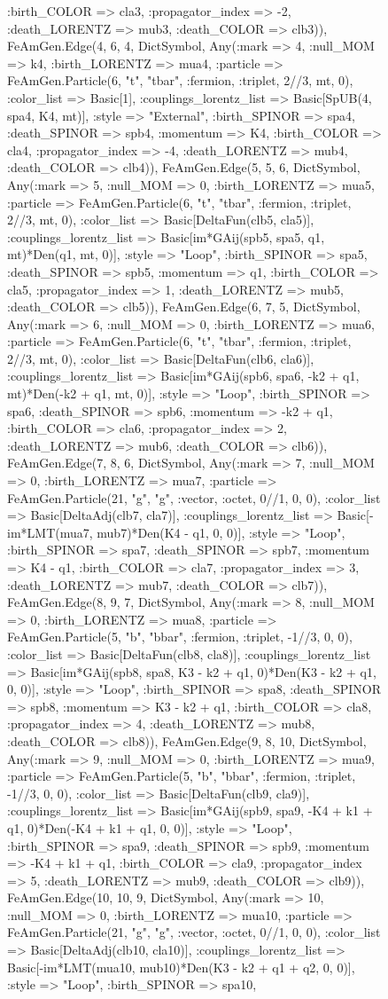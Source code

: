 \documentclass{revtex4}
\begin{document}
\begin{figure}[!htb]
\begin{center}
{:birth_COLOR => cla3, :propagator_index => -2, :death_LORENTZ => mub3, :death_COLOR => clb3)), FeAmGen.Edge(4, 6, 4, Dict{Symbol, Any}(:mark => 4, :null_MOM => k4, :birth_LORENTZ => mua4, :particle => FeAmGen.Particle(6, "t", "tbar", :fermion, :triplet, 2//3, mt, 0), :color_list => Basic[1], :couplings_lorentz_list => Basic[SpUB(4, spa4, K4, mt)], :style => "External", :birth_SPINOR => spa4, :death_SPINOR => spb4, :momentum => K4, :birth_COLOR => cla4, :propagator_index => -4, :death_LORENTZ => mub4, :death_COLOR => clb4)), FeAmGen.Edge(5, 5, 6, Dict{Symbol, Any}(:mark => 5, :null_MOM => 0, :birth_LORENTZ => mua5, :particle => FeAmGen.Particle(6, "t", "tbar", :fermion, :triplet, 2//3, mt, 0), :color_list => Basic[DeltaFun(clb5, cla5)], :couplings_lorentz_list => Basic[im*GAij(spb5, spa5, q1, mt)*Den(q1, mt, 0)], :style => "Loop", :birth_SPINOR => spa5, :death_SPINOR => spb5, :momentum => q1, :birth_COLOR => cla5, :propagator_index => 1, :death_LORENTZ => mub5, :death_COLOR => clb5)), FeAmGen.Edge(6, 7, 5, Dict{Symbol, Any}(:mark => 6, :null_MOM => 0, :birth_LORENTZ => mua6, :particle => FeAmGen.Particle(6, "t", "tbar", :fermion, :triplet, 2//3, mt, 0), :color_list => Basic[DeltaFun(clb6, cla6)], :couplings_lorentz_list => Basic[im*GAij(spb6, spa6, -k2 + q1, mt)*Den(-k2 + q1, mt, 0)], :style => "Loop", :birth_SPINOR => spa6, :death_SPINOR => spb6, :momentum => -k2 + q1, :birth_COLOR => cla6, :propagator_index => 2, :death_LORENTZ => mub6, :death_COLOR => clb6)), FeAmGen.Edge(7, 8, 6, Dict{Symbol, Any}(:mark => 7, :null_MOM => 0, :birth_LORENTZ => mua7, :particle => FeAmGen.Particle(21, "g", "g", :vector, :octet, 0//1, 0, 0), :color_list => Basic[DeltaAdj(clb7, cla7)], :couplings_lorentz_list => Basic[-im*LMT(mua7, mub7)*Den(K4 - q1, 0, 0)], :style => "Loop", :birth_SPINOR => spa7, :death_SPINOR => spb7, :momentum => K4 - q1, :birth_COLOR => cla7, :propagator_index => 3, :death_LORENTZ => mub7, :death_COLOR => clb7)), FeAmGen.Edge(8, 9, 7, Dict{Symbol, Any}(:mark => 8, :null_MOM => 0, :birth_LORENTZ => mua8, :particle => FeAmGen.Particle(5, "b", "bbar", :fermion, :triplet, -1//3, 0, 0), :color_list => Basic[DeltaFun(clb8, cla8)], :couplings_lorentz_list => Basic[im*GAij(spb8, spa8, K3 - k2 + q1, 0)*Den(K3 - k2 + q1, 0, 0)], :style => "Loop", :birth_SPINOR => spa8, :death_SPINOR => spb8, :momentum => K3 - k2 + q1, :birth_COLOR => cla8, :propagator_index => 4, :death_LORENTZ => mub8, :death_COLOR => clb8)), FeAmGen.Edge(9, 8, 10, Dict{Symbol, Any}(:mark => 9, :null_MOM => 0, :birth_LORENTZ => mua9, :particle => FeAmGen.Particle(5, "b", "bbar", :fermion, :triplet, -1//3, 0, 0), :color_list => Basic[DeltaFun(clb9, cla9)], :couplings_lorentz_list => Basic[im*GAij(spb9, spa9, -K4 + k1 + q1, 0)*Den(-K4 + k1 + q1, 0, 0)], :style => "Loop", :birth_SPINOR => spa9, :death_SPINOR => spb9, :momentum => -K4 + k1 + q1, :birth_COLOR => cla9, :propagator_index => 5, :death_LORENTZ => mub9, :death_COLOR => clb9)), FeAmGen.Edge(10, 10, 9, Dict{Symbol, Any}(:mark => 10, :null_MOM => 0, :birth_LORENTZ => mua10, :particle => FeAmGen.Particle(21, "g", "g", :vector, :octet, 0//1, 0, 0), :color_list => Basic[DeltaAdj(clb10, cla10)], :couplings_lorentz_list => Basic[-im*LMT(mua10, mub10)*Den(K3 - k2 + q1 + q2, 0, 0)], :style => "Loop", :birth_SPINOR => spa10, }
\end{center}
\end{figure}
\end{document}
